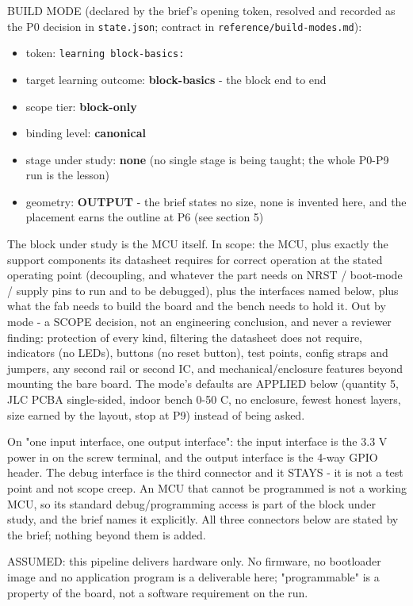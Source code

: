 \documentclass[11pt,a4paper]{article}
\begin{document}
BUILD MODE (declared by the brief's opening token, resolved and recorded as the P0 decision in \texttt{state.json}; contract in \texttt{reference/build-modes.md}):

\begin{itemize}
\item token: \texttt{learning block-basics:}
\item target learning outcome: \textbf{block-basics} - the block end to end
\item scope tier: \textbf{block-only}
\item binding level: \textbf{canonical}
\item stage under study: \textbf{none} (no single stage is being taught; the whole
P0-P9 run is the lesson)
\item geometry: \textbf{OUTPUT} - the brief states no size, none is invented here, and
the placement earns the outline at P6 (see section 5)
\end{itemize}
The block under study is the MCU itself. In scope: the MCU, plus exactly the support components its datasheet requires for correct operation at the stated operating point (decoupling, and whatever the part needs on NRST / boot-mode / supply pins to run and to be debugged), plus the interfaces named below, plus what the fab needs to build the board and the bench needs to hold it. Out by mode - a SCOPE decision, not an engineering conclusion, and never a reviewer finding: protection of every kind, filtering the datasheet does not require, indicators (no LEDs), buttons (no reset button), test points, config straps and jumpers, any second rail or second IC, and mechanical/enclosure features beyond mounting the bare board. The mode's defaults are APPLIED below (quantity 5, JLC PCBA single-sided, indoor bench 0-50 C, no enclosure, fewest honest layers, size earned by the layout, stop at P9) instead of being asked.

On "one input interface, one output interface": the input interface is the 3.3 V power in on the screw terminal, and the output interface is the 4-way GPIO header. The debug interface is the third connector and it STAYS - it is not a test point and not scope creep. An MCU that cannot be programmed is not a working MCU, so its standard debug/programming access is part of the block under study, and the brief names it explicitly. All three connectors below are stated by the brief; nothing beyond them is added.

ASSUMED: this pipeline delivers hardware only. No firmware, no bootloader image and no application program is a deliverable here; "programmable" is a property of the board, not a software requirement on the run.
\end{document}
